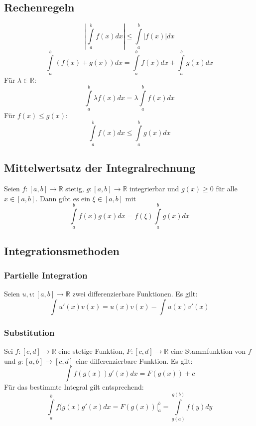 \documentclass[a4paper,twocolumn,10pt]{article}
\begin{document}
\subsection{Rechenregeln}
\begin{equation*}
\left|\int\limits_{a}^{b}f(x)dx\right|\leq \int\limits_{a}^{b}|f(x)|dx
\end{equation*}
\begin{equation*}
\int\limits_{a}^{b}(f(x)+g(x))dx=\int\limits_{a}^{b}f(x)dx+\int\limits_{a}^{b}g(x)dx
\end{equation*}
Für $\lambda\in\mathbb{R}$:
\begin{equation*}
\int\limits_{a}^{b}\lambda f(x)dx=\lambda\int\limits_{a}^{b}f(x)dx
\end{equation*}
Für $f(x)\leq g(x)$:
\begin{equation*}
\int\limits_{a}^{b}f(x)dx\leq\int\limits_{a}^{b}g(x)dx
\end{equation*}

\subsection{Mittelwertsatz der Integralrechnung}
Seien $f:[a,b]\rightarrow\mathbb{R}$ stetig, $g:[a,b]\rightarrow\mathbb{R}$ integrierbar und $g(x)\geq 0$ für alle $x\in [a,b]$. Dann gibt es ein $\xi\in[a,b]$ mit
\begin{equation*}
\int\limits_{a}^{b}f(x)g(x)dx=f(\xi)\int\limits_{a}^{b}g(x)dx
\end{equation*}

\subsection{Integrationsmethoden}

\subsubsection{Partielle Integration}
Seien $u,v:[a,b]\rightarrow\mathbb{R}$ zwei differenzierbare Funktionen. Es gilt:
\begin{equation*}
\int u'(x)v(x)=u(x)v(x)-\int u(x)v'(x)
\end{equation*}

\subsubsection{Substitution}
Sei $f:[c,d]\rightarrow\mathbb{R}$ eine stetige Funktion, $F:[c,d]\rightarrow\mathbb{R}$ eine Stammfunktion von $f$ und $g:[a,b]\rightarrow[c,d]$ eine differenzierbare Funktion. Es gilt:
\begin{equation*}
\int f(g(x))g'(x)dx=F(g(x))+c
\end{equation*}
Für das bestimmte Integral gilt entsprechend:
\begin{equation*}
\int\limits_{a}^{b}f(g(x)g'(x)dx=F(g(x))|_a^b=\int\limits_{g(a)}^{g(b)}f(y)dy
\end{equation*}
\end{document}
